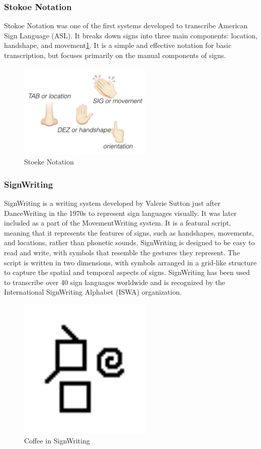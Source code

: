 \documentclass[../../main.tex]{subfiles}
\begin{document}
\subsubsection{Stokoe Notation}

Stokoe Notation\cite{stokoe1980sign} was one of the first systems developed to transcribe American Sign Language (ASL). It breaks down signs into three main components: location, handshape, and movement\ref{fig:stoeke}. It is a simple and effective notation for basic transcription, but focuses primarily on the manual components of signs.

\begin{figure}
  \centering \includegraphics[width = 2.5in]{chapters/background_work/images/stokoe.png}
  \caption{Stoeke Notation}
  \label{fig:stoeke}
\end{figure}

\subsubsection{SignWriting}

SignWriting is a writing system developed by Valerie Sutton just after DanceWriting\cite{sutton1973sutton} in the 1970s to represent sign languages visually. It was later included as a part of the MovementWriting system. It is a featural script, meaning that it represents the features of signs, such as handshapes, movements, and locations, rather than phonetic sounds. SignWriting is designed to be easy to read and write, with symbols that resemble the gestures they represent. The script is written in two dimensions, with symbols arranged in a grid-like structure to capture the spatial and temporal aspects of signs. SignWriting has been used to transcribe over 40 sign languages worldwide and is recognized by the International SignWriting Alphabet (ISWA) organization.

\begin{figure}
  \centering \includegraphics[width = 2.5in]{chapters/background_work/images/signwriting_coffee.png}
  \caption{Coffee in SignWriting}
  \label{fig:signwriting_coffee}
\end{figure}
\end{document}
